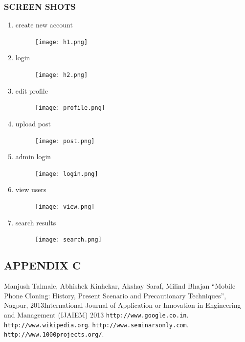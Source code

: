 \documentclass[a4paper,12pt]{article}
\begin{document}
\subsubsection{SCREEN SHOTS}  
\hspace{5mm} 
\begin{enumerate}
\item create new account
\begin{figure}[h!]
\texttt{[image: h1.png]}
\end{figure}
\newpage
\item login
\begin{figure}[h!]
\texttt{[image: h2.png]}
\end{figure}
\newpage
\item edit profile
\begin{figure}[h!]
\texttt{[image: profile.png]}
\end{figure}
\newpage
\item  upload post
\begin{figure}[h!]
\texttt{[image: post.png]}
\end{figure}
\newpage
\item  admin login
\begin{figure}[h!]
\texttt{[image: login.png]}
\end{figure}
\newpage
\item  view users
\begin{figure}[h!]
\texttt{[image: view.png]}
\end{figure}
\newpage
\item  search results
\begin{figure}[h!]
\texttt{[image: search.png]}
\end{figure}
\end{enumerate}
\newpage
\subsection{APPENDIX C} 
\begin{thebibliography}{10}
 Manjush Talmale, Abhishek Kinhekar, Akshay Saraf, Milind Bhajan “Mobile Phone Cloning: History, Present Scenario and Precautionary  Techniques”, Nagpur, 2013International Journal of Application  or  Innovation in Engineering and  Management (IJAIEM) 2013 
 \texttt{http://www.google.co.in}.
 \texttt{http://www.wikipedia.org}.
 \texttt{http://www.seminarsonly.com}.
 \texttt{http://www.1000projects.org/}.
 \end{thebibliography}
\end{document}
